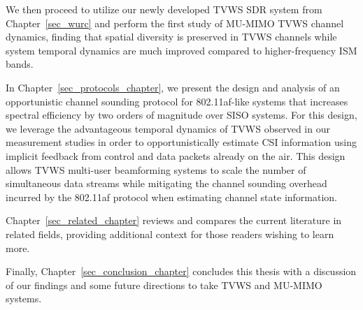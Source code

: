 	We then proceed to utilize our newly developed \ac{TVWS} \ac{SDR} system from Chapter~\ref{sec_wurc} and perform the first study of \ac{MU-MIMO} \ac{TVWS} channel dynamics, finding that spatial diversity is preserved in \ac{TVWS} channels while system temporal dynamics are much improved compared to higher-frequency \ac{ISM} bands.

	In Chapter~\ref{sec_protocols_chapter}, we present the design and analysis of an opportunistic channel sounding protocol for 802.11af-like systems that increases spectral efficiency by two orders of magnitude over \ac{SISO} systems.
	For this design, we leverage the advantageous temporal dynamics of \ac{TVWS} observed in our measurement studies in order to opportunistically estimate \ac{CSI} information using implicit feedback from control and data packets already on the air.
	This design allows \ac{TVWS} multi-user beamforming systems to scale the number of simultaneous data streams while mitigating the channel sounding overhead incurred by the 802.11af protocol when estimating channel state information.
	
	Chapter~\ref{sec_related_chapter} reviews and compares the current literature in related fields, providing additional context for those readers wishing to learn more.
	
	Finally, Chapter~\ref{sec_conclusion_chapter} concludes this thesis with a discussion of our findings and some future directions to take \ac{TVWS} and \ac{MU-MIMO} systems.
